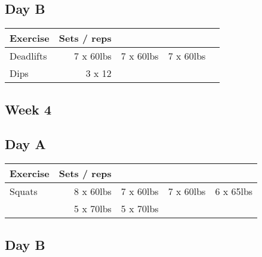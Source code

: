 \documentclass[12pt, a4paper]{article}%
\begin{document}
  \subsection*{\hspace{0.5em} Day B }


  \begin{tabular}{l|rrrr}
  \hspace{0.75em} \textbf{Exercise} & \textbf{Sets / reps} \\ \hline

            \hspace{0.75em} Deadlifts
            & 7 x 60lbs
            & 7 x 60lbs
            & 7 x 60lbs
            & 
            \\


   \hspace{0.75em} Dips & 3 x 12 \\
  \end{tabular}

 \subsection*{\hspace{0.25em} Week 4 }
  \subsection*{\hspace{0.5em} Day A }


  \begin{tabular}{l|rrrr}
  \hspace{0.75em} \textbf{Exercise} & \textbf{Sets / reps} \\ \hline

            \hspace{0.75em} Squats
            & 8 x 60lbs
            & 7 x 60lbs
            & 7 x 60lbs
            & 6 x 65lbs
            \\


            \hspace{0.75em}
            & 5 x 70lbs
            & 5 x 70lbs
            & 
            & 
            \\


  \end{tabular}

  \subsection*{\hspace{0.5em} Day B }
\end{document}
